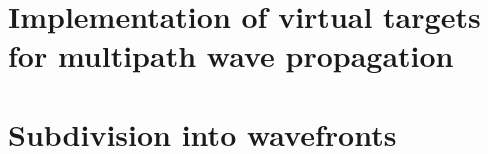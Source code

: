 \section{Implementation of virtual targets for multipath wave propagation}\label{section:virtual_targets}

\section{Subdivision into wavefronts}

